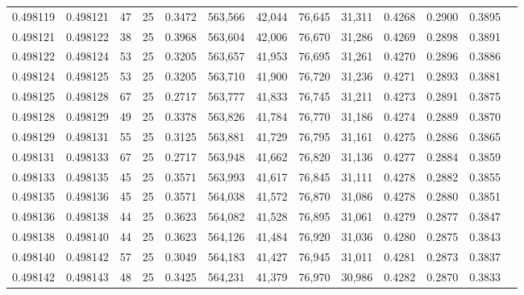 \begin{tabular}{rrrrrrrrrrrrr}
0.498119 & 0.498121 &    47 &  25 &                                     0.3472 & 563,566 &  42,044 &  76,645 &  31,311 & 0.4268 & 0.2900 & 0.3895 \\
0.498121 & 0.498122 &    38 &  25 &                                     0.3968 & 563,604 &  42,006 &  76,670 &  31,286 & 0.4269 & 0.2898 & 0.3891 \\
0.498122 & 0.498124 &    53 &  25 &                                     0.3205 & 563,657 &  41,953 &  76,695 &  31,261 & 0.4270 & 0.2896 & 0.3886 \\
0.498124 & 0.498125 &    53 &  25 &                                     0.3205 & 563,710 &  41,900 &  76,720 &  31,236 & 0.4271 & 0.2893 & 0.3881 \\
0.498125 & 0.498128 &    67 &  25 &                                     0.2717 & 563,777 &  41,833 &  76,745 &  31,211 & 0.4273 & 0.2891 & 0.3875 \\
0.498128 & 0.498129 &    49 &  25 &                                     0.3378 & 563,826 &  41,784 &  76,770 &  31,186 & 0.4274 & 0.2889 & 0.3870 \\
0.498129 & 0.498131 &    55 &  25 &                                     0.3125 & 563,881 &  41,729 &  76,795 &  31,161 & 0.4275 & 0.2886 & 0.3865 \\
0.498131 & 0.498133 &    67 &  25 &                                     0.2717 & 563,948 &  41,662 &  76,820 &  31,136 & 0.4277 & 0.2884 & 0.3859 \\
0.498133 & 0.498135 &    45 &  25 &                                     0.3571 & 563,993 &  41,617 &  76,845 &  31,111 & 0.4278 & 0.2882 & 0.3855 \\
0.498135 & 0.498136 &    45 &  25 &                                     0.3571 & 564,038 &  41,572 &  76,870 &  31,086 & 0.4278 & 0.2880 & 0.3851 \\
0.498136 & 0.498138 &    44 &  25 &                                     0.3623 & 564,082 &  41,528 &  76,895 &  31,061 & 0.4279 & 0.2877 & 0.3847 \\
0.498138 & 0.498140 &    44 &  25 &                                     0.3623 & 564,126 &  41,484 &  76,920 &  31,036 & 0.4280 & 0.2875 & 0.3843 \\
0.498140 & 0.498142 &    57 &  25 &                                     0.3049 & 564,183 &  41,427 &  76,945 &  31,011 & 0.4281 & 0.2873 & 0.3837 \\
0.498142 & 0.498143 &    48 &  25 &                                     0.3425 & 564,231 &  41,379 &  76,970 &  30,986 & 0.4282 & 0.2870 & 0.3833 \\

\end{tabular}

